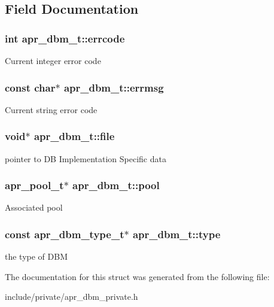 \subsection{Field Documentation}
\hypertarget{structapr__dbm__t_a130a628921f4c46241d09476f8a3090c}{
\subsubsection[{errcode}]{\setlength{\rightskip}{0pt plus 5cm}int apr\-\_\-dbm\-\_\-t\-::errcode}}\label{structapr__dbm__t_a130a628921f4c46241d09476f8a3090c}
Current integer error code \hypertarget{structapr__dbm__t_adc3defc90b90fe3411c099631f75a653}{
\subsubsection[{errmsg}]{\setlength{\rightskip}{0pt plus 5cm}const char$\ast$ apr\-\_\-dbm\-\_\-t\-::errmsg}}\label{structapr__dbm__t_adc3defc90b90fe3411c099631f75a653}
Current string error code \hypertarget{structapr__dbm__t_a228e2548b3a034d8d16451af4b93f3f1}{
\subsubsection[{file}]{\setlength{\rightskip}{0pt plus 5cm}void$\ast$ apr\-\_\-dbm\-\_\-t\-::file}}\label{structapr__dbm__t_a228e2548b3a034d8d16451af4b93f3f1}
pointer to D\-B Implementation Specific data \hypertarget{structapr__dbm__t_af80b38e28d1504e98f9aa3308285bf9b}{
\subsubsection[{pool}]{\setlength{\rightskip}{0pt plus 5cm}apr\-\_\-pool\-\_\-t$\ast$ apr\-\_\-dbm\-\_\-t\-::pool}}\label{structapr__dbm__t_af80b38e28d1504e98f9aa3308285bf9b}
Associated pool \hypertarget{structapr__dbm__t_a27287213e7ebe16d9945207a13300faf}{
\subsubsection[{type}]{\setlength{\rightskip}{0pt plus 5cm}const {\bf apr\-\_\-dbm\-\_\-type\-\_\-t}$\ast$ apr\-\_\-dbm\-\_\-t\-::type}}\label{structapr__dbm__t_a27287213e7ebe16d9945207a13300faf}
the type of D\-B\-M 

The documentation for this struct was generated from the following file\-:\begin{DoxyCompactItemize}
\item 
include/private/apr\-\_\-dbm\-\_\-private.\-h\end{DoxyCompactItemize}
